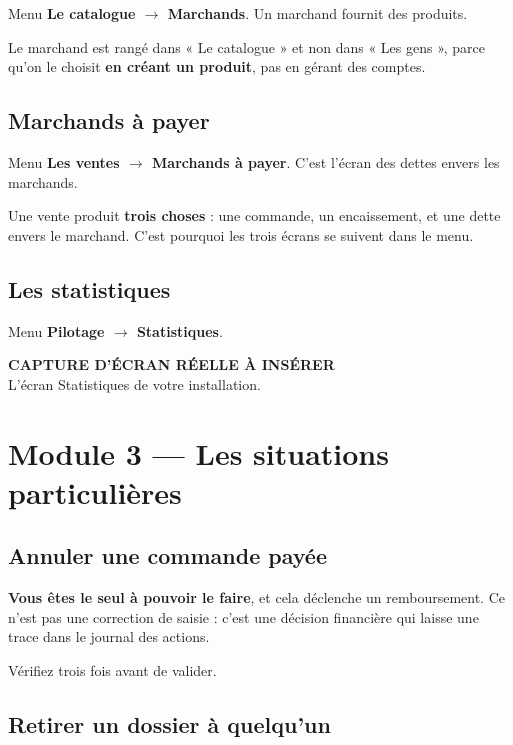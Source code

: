\documentclass[11pt,a4paper]{report}
\newcommand{\captureAInserer}[2][3.4cm]{%
  \begin{center}
  \begin{tcolorbox}[width=\linewidth,height=#1,
    colback=garahFond,colframe=garahAttenue,boxrule=0.9pt,arc=4pt,
    halign=center,valign=center]
    {\small\bfseries\color{garahAttenue}CAPTURE D'ÉCRAN RÉELLE À INSÉRER}\\[4pt]
    {\footnotesize\color{garahAttenue}#2}
  \end{tcolorbox}
  \end{center}
}
\begin{document}
Menu \textbf{Le catalogue $\rightarrow$ Marchands}. Un marchand fournit des
produits.

\begin{astuce}
Le marchand est rangé dans « Le catalogue » et non dans « Les gens », parce
qu'on le choisit \textbf{en créant un produit}, pas en gérant des comptes.
\end{astuce}

\subsection{Marchands à payer}

Menu \textbf{Les ventes $\rightarrow$ Marchands à payer}. C'est l'écran des
dettes envers les marchands.

\begin{retenir}
Une vente produit \textbf{trois choses} : une commande, un encaissement, et une
dette envers le marchand. C'est pourquoi les trois écrans se suivent dans le
menu.
\end{retenir}

\subsection{Les statistiques}

Menu \textbf{Pilotage $\rightarrow$ Statistiques}.

\captureAInserer[9em]{L'écran Statistiques de votre installation.}

\section{Module 3 — Les situations particulières}

\subsection{Annuler une commande payée}

\begin{attention}
\textbf{Vous êtes le seul à pouvoir le faire}, et cela déclenche un
remboursement. Ce n'est pas une correction de saisie : c'est une décision
financière qui laisse une trace dans le journal des actions.

Vérifiez trois fois avant de valider.
\end{attention}

\subsection{Retirer un dossier à quelqu'un}
\end{document}
